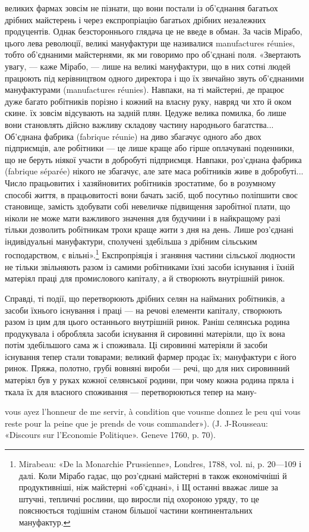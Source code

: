 великих фармах зовсім не пізнати, що вони постали із об’єднання
багатьох дрібних майстерень і через експропріацію багатьох
дрібних незалежних продуцентів. Однак безстороннього глядача
це не введе в обман. За часів Мірабо, цього лева революції, великі
мануфактури ще називалися manufactures réunies, тобто об’єднаними
майстернями, як ми говоримо про об’єднані поля. «Звертають
увагу, — каже Мірабо, — лише на великі мануфактури,
що в них сотні людей працюють під керівництвом одного директора
і що їх звичайно звуть об’єднаними мануфактурами (manufactures
réunies). Навпаки, на ті майстерні, де працює дуже багато
робітників порізно і кожний на власну руку, навряд чи
хто й оком скине. їх зовсім відсувають на задній плян. Цедуже
велика помилка, бо лише вони становлять дійсно важливу складову
частину народнього багатства... Об’єднана фабрика (fabrique
réunie) на диво збагачує одного або двох підприємців, але
робітники — це лише краще або гірше оплачувані поденники,
що не беруть ніякої участи в добробуті підприємця. Навпаки,
роз’єднана фабрика (fabrique séparée) нікого не збагачує, але
зате маса робітників живе в добробуті... Число працьовитих і
хазяйновитих робітників зростатиме, бо в розумному способі
життя, в працьовитості вони бачать засіб, щоб посутньо поліпшити
своє становище, замість здобувати собі невеличке підвищення
заробітної плати, що ніколи не може мати важливого
значення для будучини і в найкращому разі тільки дозволить
робітникам трохи краще жити з дня на день. Лише роз’єднані
індивідуальні мануфактури, сполучені здебільша з дрібним сільським
господарством, є вільні».\footnote{
Mirabeau: «De la Monarchie Prussienne», Londres, 1788, vol. ni,
p. 20—109 і далі. Коли Мірабо гадає, що роз’єднані майстерні в
також економічніші й продуктивніші, ніж майстерні «об’єднані», і Щ
останні вважає лише за штучні, тепличні рослини, що виросли під охороною
уряду, то це пояснюється тодішнім станом більшої частини континентальних
мануфактур.
} Експропріяція і зганяння
частини сільської людности не тільки звільняють разом із самими
робітниками їхні засоби існування і їхній матеріял праці для
промислового капіталу, а й створюють внутрішній ринок.

Справді, ті події, що перетворюють дрібних селян на найманих
робітників, а засоби їхнього існування і праці — на речові
елементи капіталу, створюють разом із цим для цього останнього
внутрішній ринок. Раніш селянська родина продукувала
і обробляла засоби існування й сировинні матеріяли, що їх вона
потім здебільшого сама ж і споживала. Ці сировинні матеріяли
й засоби існування тепер стали товарами; великий фармер продає
їх; мануфактури є його ринок. Пряжа, полотно, грубі вовняні
вироби — речі, що для них сировинний матеріял був у руках
кожної селянської родини, при чому кожна родина пряла і ткала
їх для власного споживання — перетворюються тепер на ману-

vous ayez l’honneur de me servir, à condition que vousme donnez le peu
qui vous reste pour la peine que je prends de vous commander»). (J. J-Rousseau:
«Discours sur l’Economie Politique». Geneve 1760, p. 70).